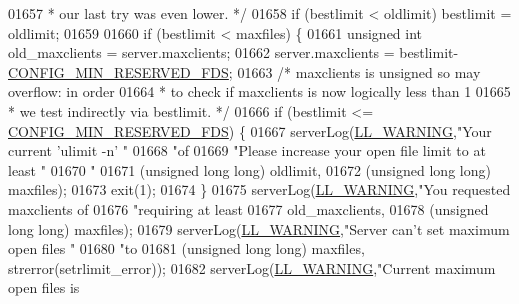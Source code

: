 \begin{DoxyCode}
{{{{{{{{{{{{{{{{01657 \textcolor{comment}{             * our last try was even lower. */}
01658             \textcolor{keywordflow}{if} (bestlimit < oldlimit) bestlimit = oldlimit;
01659 
01660             \textcolor{keywordflow}{if} (bestlimit < maxfiles) \{
01661                 \textcolor{keywordtype}{unsigned} \textcolor{keywordtype}{int} old\_maxclients = server.maxclients;
01662                 server.maxclients = bestlimit-\hyperlink{server_8h_abcea50457e3de849eab11d0ba5d81d08}{CONFIG\_MIN\_RESERVED\_FDS};
01663                 \textcolor{comment}{/* maxclients is unsigned so may overflow: in order}
01664 \textcolor{comment}{                 * to check if maxclients is now logically less than 1}
01665 \textcolor{comment}{                 * we test indirectly via bestlimit. */}
01666                 \textcolor{keywordflow}{if} (bestlimit <= \hyperlink{server_8h_abcea50457e3de849eab11d0ba5d81d08}{CONFIG\_MIN\_RESERVED\_FDS}) \{
01667                     serverLog(\hyperlink{server_8h_a31229b9334bba7d6be2a72970967a14b}{LL\_WARNING},\textcolor{stringliteral}{"Your current 'ulimit -n' "}
01668                         \textcolor{stringliteral}{"of %
01669                         \textcolor{stringliteral}{"Please increase your open file limit to at least "}
01670                         \textcolor{stringliteral}{"%
01671                         (\textcolor{keywordtype}{unsigned} \textcolor{keywordtype}{long} \textcolor{keywordtype}{long}) oldlimit,
01672                         (\textcolor{keywordtype}{unsigned} \textcolor{keywordtype}{long} \textcolor{keywordtype}{long}) maxfiles);
01673                     exit(1);
01674                 \}
01675                 serverLog(\hyperlink{server_8h_a31229b9334bba7d6be2a72970967a14b}{LL\_WARNING},\textcolor{stringliteral}{"You requested maxclients of %
01676                     \textcolor{stringliteral}{"requiring at least %
01677                     old\_maxclients,
01678                     (\textcolor{keywordtype}{unsigned} \textcolor{keywordtype}{long} \textcolor{keywordtype}{long}) maxfiles);
01679                 serverLog(\hyperlink{server_8h_a31229b9334bba7d6be2a72970967a14b}{LL\_WARNING},\textcolor{stringliteral}{"Server can't set maximum open files "}
01680                     \textcolor{stringliteral}{"to %
01681                     (\textcolor{keywordtype}{unsigned} \textcolor{keywordtype}{long} \textcolor{keywordtype}{long}) maxfiles, strerror(setrlimit\_error));
01682                 serverLog(\hyperlink{server_8h_a31229b9334bba7d6be2a72970967a14b}{LL\_WARNING},\textcolor{stringliteral}{"Current maximum open files is %
}}}}}}}}}}}}}}}}}}}}}}
\end{DoxyCode}
